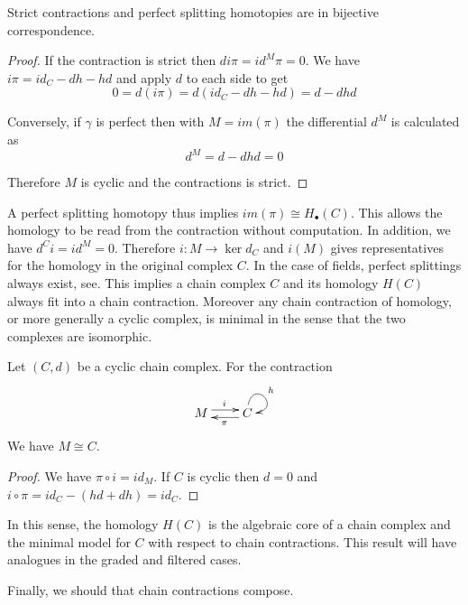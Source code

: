 \begin{prop}
Strict contractions and perfect splitting homotopies are in bijective correspondence.
\end{prop}
\begin{proof}
If the contraction is strict then $di\pi = id^M\pi = 0$.  We have $i\pi = id_C-dh-hd$ and apply $d$ to each side to get $$0=d(i\pi) = d(id_C-dh-hd) = d-dhd$$

Conversely, if $\gamma$ is perfect then with $M=im(\pi)$ the differential $d^M$ is calculated as $$d^M=d-dhd=0$$ 

Therefore $M$ is cyclic and the contractions is strict.
\end{proof}

A perfect splitting homotopy thus implies $im(\pi)\cong H_\bullet (C)$.  This allows the homology to be read from the contraction without computation.  In addition, we have $d^Ci = id^M = 0$.  Therefore $i:M\to \ker d_C$ and $i(M)$ gives representatives for the homology in the original complex $C$. In the case of fields, perfect splittings always exist, see.  This implies a chain complex $C$ and its homology $H(C)$ always fit into a chain contraction. Moreover any chain contraction of homology, or more generally a cyclic complex, is minimal in the sense that the two complexes are isomorphic.

\begin{prop}\label{prop:cont:cyclic}
Let $(C,d)$ be a cyclic chain complex. For the contraction
\[
\xymatrixrowsep{0.03in}
\xymatrixcolsep{0.3in}
\xymatrix{
M  \ar[r]<3pt>^{i} & \ar[l]<3pt>^{\pi} C \ar@(u,r)^{h}
}
\]
We have $M\cong C$.
\end{prop}
\begin{proof}
We have $\pi \circ i  = id_M$.  If $C$ is cyclic then $d=0$ and $i\circ\pi = id_C-(hd+dh) = id_C$.
\end{proof}

In this sense, the homology $H(C)$ is the algebraic core of a chain complex and the minimal model for $C$ with respect to chain contractions.  This result will have analogues in the graded and filtered cases.

Finally, we should that chain contractions compose.  

